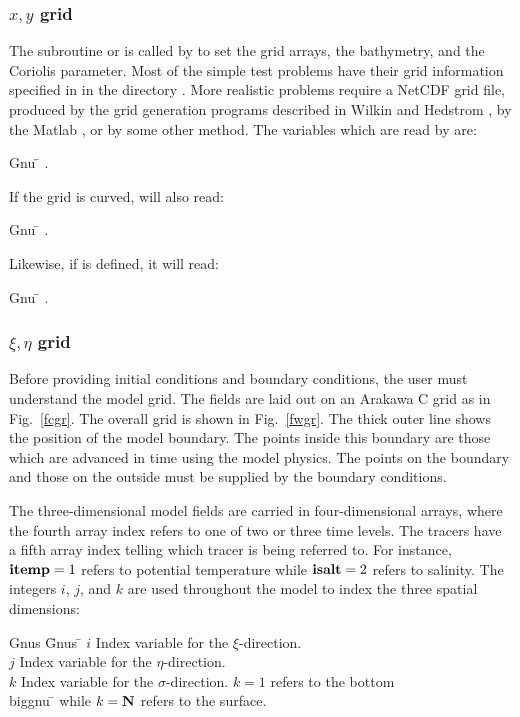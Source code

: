 \subsubsection{$x,y$ grid}
The subroutine  or  is called by
 to set the grid arrays, the bathymetry, and the
Coriolis parameter.  Most of the simple test problems have their grid
information specified in  in the directory
.  More realistic problems require a NetCDF grid
file, produced by the grid generation programs described in Wilkin and
Hedstrom \cite{GRIDS}, by the Matlab , or by some
other method.  The variables which are read by  are:
\begin{tabbing}
  Gnu \= \kill
  \> .
\end{tabbing}
If the grid is curved,  will also read:
\begin{tabbing}
  Gnu \= \kill
  \> .
\end{tabbing}
Likewise, if  is defined, it will read:
\begin{tabbing}
  Gnu \= \kill
  \> .
\end{tabbing}

\subsubsection {$\xi,\eta$ grid}
Before providing initial conditions and boundary conditions, the
user must understand the model grid. The fields are laid out on an
Arakawa C grid as in Fig.\ \ref{fcgr}. The overall grid is shown in
Fig.\ \ref{fwgr}.  The thick outer line shows the position of the
model boundary. The points inside this boundary are those which are
advanced in time using the model physics. The points on the boundary
and those on the outside must be supplied by the boundary
conditions.

The three-dimensional model fields are carried in four-dimensional
arrays, where the fourth array index refers to one of two or three
time levels. The tracers have a fifth array index telling which
tracer is being referred to.
For instance, $\mbox{\bf itemp}=1$ refers to
potential temperature while $\mbox{\bf isalt}=2$ refers to salinity.  The
integers $i$, $j$, and $k$ are used throughout the model to index
the three spatial dimensions:
\begin{tabbing}
Gnus \= Gnus \= \kill
   \>$i$ \>Index variable for the $\xi$-direction. \\
   \>$j$ \>Index variable for the $\eta$-direction. \\
   \>$k$ \>Index variable for the $\sigma$-direction.  $k = 1$
   refers to the bottom \\
biggnu \= \kill
   \>while $k = \mbox{\bf N}$ refers to the surface.
\end{tabbing}

